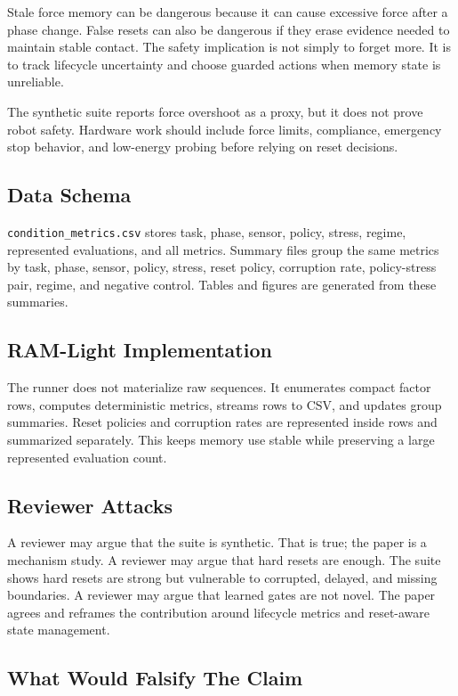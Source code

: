 \documentclass{article}
\begin{document}
Stale force memory can be dangerous because it can cause excessive force after
a phase change. False resets can also be dangerous if they erase evidence
needed to maintain stable contact. The safety implication is not simply to
forget more. It is to track lifecycle uncertainty and choose guarded actions
when memory state is unreliable.

The synthetic suite reports force overshoot as a proxy, but it does not prove
robot safety. Hardware work should include force limits, compliance, emergency
stop behavior, and low-energy probing before relying on reset decisions.

\subsection{Data Schema}

\texttt{condition\_metrics.csv} stores task, phase, sensor, policy, stress,
regime, represented evaluations, and all metrics. Summary files group the same
metrics by task, phase, sensor, policy, stress, reset policy, corruption rate,
policy-stress pair, regime, and negative control. Tables and figures are
generated from these summaries.

\subsection{RAM-Light Implementation}

The runner does not materialize raw sequences. It enumerates compact factor
rows, computes deterministic metrics, streams rows to CSV, and updates group
summaries. Reset policies and corruption rates are represented inside rows and
summarized separately. This keeps memory use stable while preserving a large
represented evaluation count.

\subsection{Reviewer Attacks}

A reviewer may argue that the suite is synthetic. That is true; the paper is a
mechanism study. A reviewer may argue that hard resets are enough. The suite
shows hard resets are strong but vulnerable to corrupted, delayed, and missing
boundaries. A reviewer may argue that learned gates are not novel. The paper
agrees and reframes the contribution around lifecycle metrics and reset-aware
state management.

\subsection{What Would Falsify The Claim}
\end{document}
